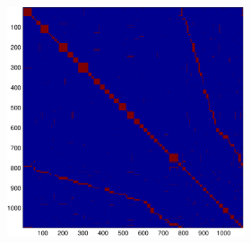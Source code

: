 \documentclass{article} %
\begin{document}
\begin{figure}
\begin{subfigure}[c]{\textwidth}
\begin{subfigure}[]{0.195\textwidth}
			\label{fig:7_8_s_su}
		\end{subfigure}
		\begin{subfigure}[c]{0.195\textwidth}
			\includegraphics[width = \textwidth]{./img/adj7_8_s.pdf}
			\label{fig7_8_s_adj}
		\end{subfigure}
	\end{subfigure}

	
	\begin{subfigure}[t]{\textwidth}
		\centering
		\begin{subfigure}[t]{0.195\textwidth}
		\end{subfigure}
		\begin{subfigure}[t]{0.195\textwidth}
		\end{subfigure}
		\begin{subfigure}[t]{0.195\textwidth}
		\end{subfigure}
		\begin{subfigure}[t]{0.195\textwidth}
		\end{subfigure}
		\begin{subfigure}[t]{0.195\textwidth}
		\end{subfigure}
	\end{subfigure}

	\caption{}
\end{figure}
\end{document}

